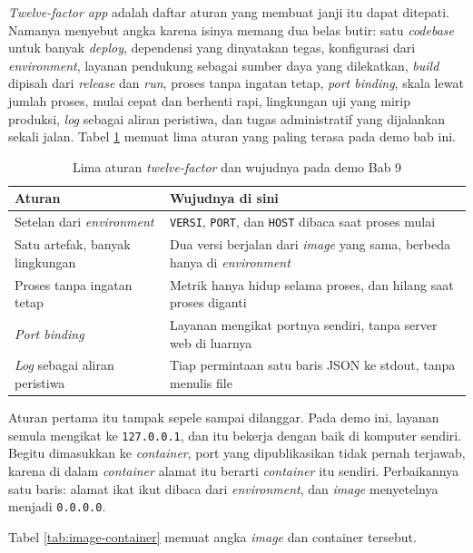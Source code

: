 \textit{Twelve-factor app} \cite{twelve-factor} adalah daftar aturan yang
membuat janji itu dapat ditepati. Namanya menyebut angka karena isinya memang
dua belas butir: satu \textit{codebase} untuk banyak \textit{deploy},
dependensi yang dinyatakan tegas, konfigurasi dari \textit{environment},
layanan pendukung sebagai sumber daya yang dilekatkan, \textit{build}
dipisah dari \textit{release} dan \textit{run}, proses tanpa ingatan tetap,
\textit{port binding}, skala lewat jumlah proses, mulai cepat dan berhenti
rapi, lingkungan uji yang mirip produksi, \textit{log} sebagai aliran
peristiwa, dan tugas administratif yang dijalankan sekali jalan. Tabel
\ref{tab:12factor} memuat lima aturan yang paling terasa pada demo bab ini.

\begin{table}[!htb]
  \centering
  \caption{Lima aturan \textit{twelve-factor} dan wujudnya pada demo Bab 9}
  \label{tab:12factor}
  \begin{tabularx}{\textwidth}{lX}
    \hline
    \textbf{Aturan} & \textbf{Wujudnya di sini} \\
    \hline
    Setelan dari \textit{environment} & \texttt{VERSI}, \texttt{PORT}, dan \texttt{HOST} dibaca saat proses mulai \\
    \hline
    Satu artefak, banyak lingkungan & Dua versi berjalan dari \textit{image} yang sama, berbeda hanya di \textit{environment} \\
    \hline
    Proses tanpa ingatan tetap & Metrik hanya hidup selama proses, dan hilang saat proses diganti \\
    \hline
    \textit{Port binding} & Layanan mengikat portnya sendiri, tanpa server web di luarnya \\
    \hline
    \textit{Log} sebagai aliran peristiwa & Tiap permintaan satu baris JSON ke stdout, tanpa menulis file \\
    \hline
  \end{tabularx}
\end{table}

Aturan pertama itu tampak sepele sampai dilanggar. Pada demo ini, layanan
semula mengikat ke \texttt{127.0.0.1}, dan itu bekerja dengan baik di
komputer sendiri. Begitu dimasukkan ke \textit{container}, port yang
dipublikasikan tidak pernah terjawab, karena di dalam \textit{container}
alamat itu berarti \textit{container} itu sendiri. Perbaikannya satu baris:
alamat ikat ikut dibaca dari \textit{environment}, dan \textit{image}
menyetelnya menjadi \texttt{0.0.0.0}.

Tabel \ref{tab:image-container} memuat angka \textit{image} dan container tersebut.

